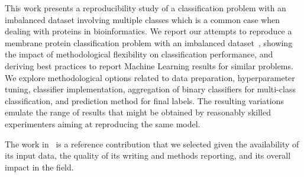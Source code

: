 This work presents a reproducibility study of a classification problem with an imbalanced dataset 
involving multiple classes which is a common case when dealing with proteins in bioinformatics. 
We report our attempts to reproduce a membrane protein classification problem with an imbalanced 
dataset~\cite{mishra2014prediction}, showing the impact of methodological
flexibility on classification performance, and deriving best practices to
report Machine Learning results for similar problems. We explore
methodological options related to data preparation, hyperparameter tuning,
classifier implementation, aggregation of binary classifiers for
multi-class classification, and prediction method for final labels. The
resulting variations emulate the range of results that might be obtained by
reasonably skilled experimenters aiming at reproducing the same model.


The work in~\cite{mishra2014prediction}
 is a reference contribution that we selected given
the availability of its input data, the quality of its writing and methods
reporting, and its overall impact in the field. 
